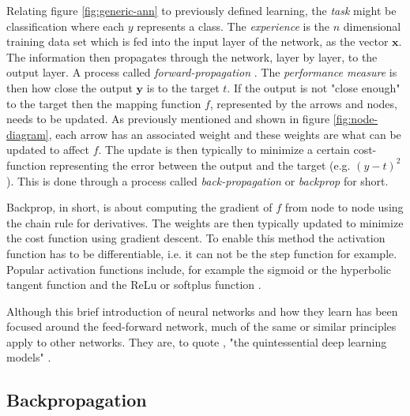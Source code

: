Relating figure \ref{fig:generic-ann} to previously defined learning, the \textit{task} might be classification where each $y$ represents a class.
The \textit{experience} is the $n$ dimensional training data set which is fed into the input layer of the network, as the vector $\mathbf{x}$.
The information then propagates through the network, layer by layer, to the output layer. A process called \textit{forward-propagation} \cite{Goodfellow2016}.
The \textit{performance measure} is then how close the output $\mathbf{y}$ is to the target $t$.
If the output is not "close enough" to the target then the mapping function $f$, represented by the arrows and nodes, needs to be updated.
As previously mentioned and shown in figure \ref{fig:node-diagram}, each arrow has an associated weight and these weights are what can be updated to affect $f$.
The update is then typically to minimize a certain cost-function representing the error between the output and the target (e.g. $(y-t)^2$).
This is done through a process called \textit{back-propagation} or \textit{backprop} for short.

Backprop, in short, is about computing the gradient of $f$ from node to node using the chain rule for derivatives. 
The weights are then typically updated to minimize the cost function using gradient descent.
To enable this method the activation function has to be differentiable, i.e. it can not be the step function for example.
Popular activation functions include, for example the sigmoid or the hyperbolic tangent function and the ReLu or softplus function \cite{Goodfellow2016, Haykin2009, Rojas1996}.

Although this brief introduction of neural networks and how they learn has been focused around the feed-forward network, much of the same or similar principles apply to other networks. 
They are, to quote \citeauthor{Goodfellow2016}, "the quintessential deep learning models" \parencite[164]{Goodfellow2016}.




\subsection{Backpropagation}

